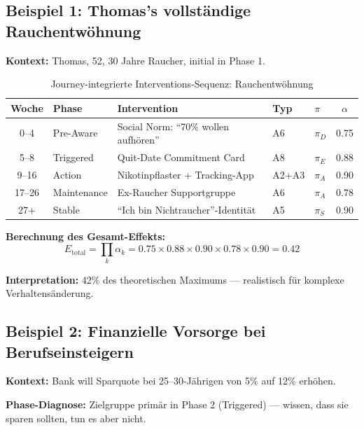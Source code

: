 \subsection{Beispiel 1: Thomas's vollständige Rauchentwöhnung}

\textbf{Kontext:} Thomas, 52, 30 Jahre Raucher, initial in Phase 1.

\begin{table}[htbp]
\centering
\caption{Journey-integrierte Interventions-Sequenz: Rauchentwöhnung}
\label{tab:18-example-thomas}
\renewcommand{\arraystretch}{1.3}
\small
\begin{tabular}{@{}cllllc@{}}
\toprule
\textbf{Woche} & \textbf{Phase} & \textbf{Intervention} & \textbf{Typ} & \textbf{$\pi$} & \textbf{$\alpha$} \\
\midrule
0--4 & Pre-Aware & Social Norm: ``70\% wollen aufh\"{o}ren'' & A6 & $\pi_D$ & 0.75 \\
5--8 & Triggered & Quit-Date Commitment Card & A8 & $\pi_E$ & 0.88 \\
9--16 & Action & Nikotinpflaster + Tracking-App & A2+A3 & $\pi_A$ & 0.90 \\
17--26 & Maintenance & Ex-Raucher Supportgruppe & A6 & $\pi_A$ & 0.78 \\
27+ & Stable & ``Ich bin Nichtraucher''-Identit\"{a}t & A5 & $\pi_S$ & 0.90 \\
\bottomrule
\end{tabular}
\end{table}

\textbf{Berechnung des Gesamt-Effekts:}
\begin{equation}
E_{\text{total}} = \prod_k \alpha_k = 0.75 \times 0.88 \times 0.90 \times 0.78 \times 0.90 = 0.42
\label{eq:18-thomas-effect}
\end{equation}

\textbf{Interpretation:} 42\% des theoretischen Maximums --- realistisch für komplexe Verhaltensänderung.

\subsection{Beispiel 2: Finanzielle Vorsorge bei Berufseinsteigern}

\textbf{Kontext:} Bank will Sparquote bei 25--30-Jährigen von 5\% auf 12\% erhöhen.

\textbf{Phase-Diagnose:} Zielgruppe primär in Phase 2 (Triggered) --- wissen, dass sie sparen sollten, tun es aber nicht.

